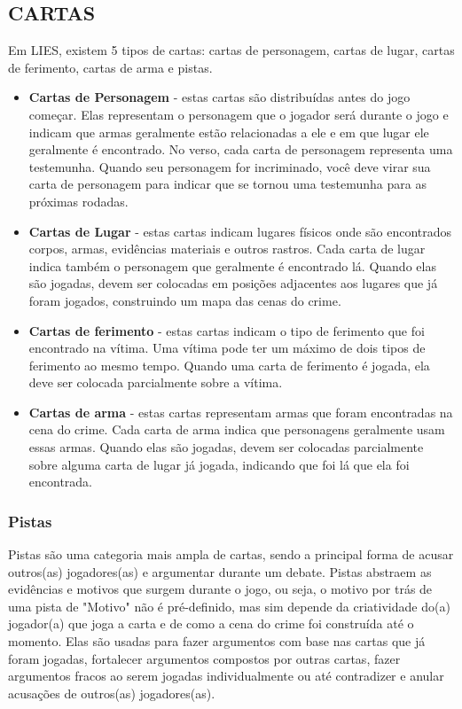 \documentclass[a4paper, 11pt]{article}
\begin{document}
\subsection*{CARTAS}


	Em LIES, existem 5 tipos de cartas: cartas de personagem, cartas de lugar, cartas de ferimento, cartas de arma e pistas.

	\begin{itemize}
		\item \textbf{Cartas de Personagem} - estas cartas são distribuídas antes do jogo começar. Elas representam o personagem que o jogador será durante o jogo e indicam que armas geralmente estão relacionadas a ele e em que lugar ele geralmente é encontrado. No verso, cada carta de personagem representa uma testemunha. Quando seu personagem for incriminado, você deve virar sua carta de personagem para indicar que se tornou uma testemunha para as próximas rodadas.

		\item \textbf{Cartas de Lugar} - estas cartas indicam lugares físicos onde são encontrados corpos, armas, evidências materiais e outros rastros. Cada carta de lugar indica também o personagem que geralmente é encontrado lá. Quando elas são jogadas, devem ser colocadas em posições adjacentes aos lugares que já foram jogados, construindo um mapa das cenas do crime.

		\item \textbf{Cartas de ferimento} - estas cartas indicam o tipo de ferimento que foi encontrado na vítima. Uma vítima pode ter um máximo de dois tipos de ferimento ao mesmo tempo. Quando uma carta de ferimento é jogada, ela deve ser colocada parcialmente sobre a vítima.

		\item \textbf{Cartas de arma} - estas cartas representam armas que foram encontradas na cena do crime. Cada carta de arma indica que personagens geralmente usam essas armas. Quando elas são jogadas, devem ser colocadas parcialmente sobre alguma carta de lugar já jogada, indicando que foi lá que ela foi encontrada.
	\end{itemize}

	\subsubsection*{Pistas}

		Pistas são uma categoria mais ampla de cartas, sendo a principal forma de acusar outros(as) jogadores(as) e argumentar durante um debate. Pistas abstraem as evidências e motivos que surgem durante o jogo, ou seja, o motivo por trás de uma pista de "Motivo" não é pré-definido, mas sim depende da criatividade do(a) jogador(a) que joga a carta e de como a cena do crime foi construída até o momento. Elas são usadas para fazer argumentos com base nas cartas que já foram jogadas, fortalecer argumentos compostos por outras cartas, fazer argumentos fracos ao serem jogadas individualmente ou até contradizer e anular acusações de outros(as) jogadores(as). 
		
\end{document}
